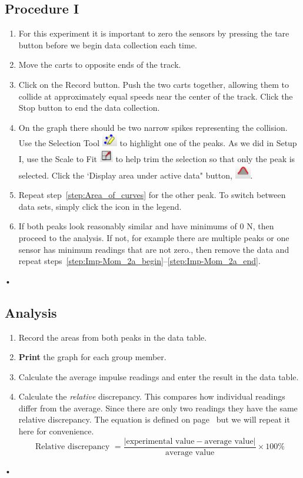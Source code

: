 \documentclass[main.tex]{subfiles}
\begin{document}
\subsection*{Procedure I}
\begin{enumerate}
\item \label{step:Imp-Mom_2a_begin}
For this experiment it is important to zero the sensors by pressing the tare button before we begin data collection each time.
\item
Move the carts to opposite ends of the track.
\item
Click on the Record button. Push the two carts together, allowing them to collide at approximately equal speeds near the center of the track. Click the Stop button to end the data collection.
\item \label{step:Area_of_curves}
On the graph there should be two narrow spikes representing the collision. Use the Selection Tool \includegraphics{Selection_Tool} to highlight one of the peaks. As we did in Setup I, use the Scale to Fit \includegraphics{Rescale} to help trim the selection so that only the peak is selected. Click the `Display area under active data" button, \includegraphics{Area_Under_Curve}. 
\item \label{step:Imp-Mom_2a_end}
Repeat step~\ref{step:Area_of_curves} for the other peak. To switch between data sets, simply click the icon in the legend.
\item
If both peaks look reasonably similar and have minimums of 0 N, then proceed to the analysis. If not, for example there are multiple peaks or one sensor has minimum readings that are not zero., then remove the data and repeat steps~\ref{step:Imp-Mom_2a_begin}--\ref{step:Imp-Mom_2a_end}.
\end{enumerate}•

\subsection*{Analysis}
\begin{enumerate}
\item
Record the areas from both peaks in the data table.
\item
\textbf{Print} the graph for each group member.
\item
Calculate the average impulse readings and enter the result in the data table.
\item
Calculate the \emph{relative} discrepancy. This compares how individual readings differ from the average. Since there are only two readings they have the same relative discrepancy. The equation is defined on page~\pageref{page:Relative_Discrepancy} but we will repeat it here for convenience.
\[
\text{Relative discrepancy } = \frac{|\text{experimental value} - \text{average value}|}{\text{average value}} \times 100\%
\]
\end{enumerate}•
\end{document}
